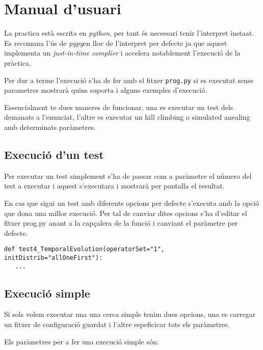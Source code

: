 \section{Manual d'usuari}

La practica està escrita en \emph{python}\footnotemark, per tant és necessari tenir
l'interpret insta\lgem at.
Es recomana l'ús de \emph{pypy}\footnotemark en lloc de l'interpret per defecte ja 
que aquest implementa un \emph{just-in-time complier} i accelera notablement l'execució
de la pràctica.

Per dur a terme l'execució s'ha de fer amb el fitxer \texttt{prog.py} si es executat
sense parametres mostrarà quins suporta i alguns exemples d'execució.

Essencialment te dues maneres de funcionar, una es executar un test dels demanats a l'enunciat,
l'altre es executar un hill climbing o simulated anealing amb determinats paràmetres.

\subsection{Execució d'un test}
Per executar un test simplement s'ha de passar com a paràmetre el número del test a executar i 
aquest s'executara i mostrarà per pantalla el resultat.

En cas que sigui un test amb diferents opcions per defecte s'executa amb la opció que dona
una millor execució. Per tal de canviar dites opcions s'ha d'editar el fitxer prog.py anant
a la capçalera de la funció i canviant el paràmetre per defecte.

\begin{verbatim}
def test4_TemporalEvolution(operatorSet="1", initDistrib="allOneFirst"):
   ...
\end{verbatim}

\subsection{Execució simple}
Si sols volem executar una una cerca simple tenim dues opcions, una es carregar un fitxer de configuració
guardat i l'altre espeficicar tots els paràmetres.

Els paràmetres per a fer una execució simple són:


